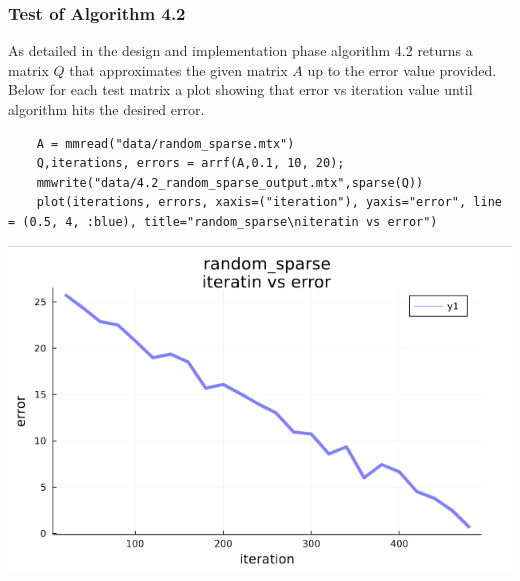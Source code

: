\documentclass[11pt,a4paper]{article}
\theoremstyle{definition}
\begin{document}
	\subsubsection{Test of Algorithm 4.2}
	As detailed in the design and implementation phase algorithm 4.2 returns a matrix $Q$ that approximates the given matrix $A$ up to the error value provided. Below for each test matrix a plot showing that error vs iteration value until algorithm hits the desired error.
	
	\begin{lstlisting}
	A = mmread("data/random_sparse.mtx")
	Q,iterations, errors = arrf(A,0.1, 10, 20);
	mmwrite("data/4.2_random_sparse_output.mtx",sparse(Q))
	plot(iterations, errors, xaxis=("iteration"), yaxis="error", line = (0.5, 4, :blue), title="random_sparse\niteratin vs error")
	\end{lstlisting}
	\includegraphics[scale=0.5]{images/4.2_1.png}
\end{document}
